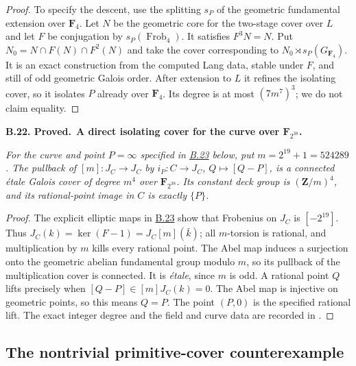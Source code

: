 \documentclass[11pt,a4paper]{article}
\newenvironment{claim}[3]{\par\medskip\noindent\hypertarget{#1}{\textbf{#1. #2.}}\ \textbf{#3.}\par\nopagebreak\smallskip\begingroup\itshape}{\endgroup\par\smallskip}
\newcommand{\statementref}[1]{\hyperlink{#1}{#1}}
\begin{document}
\begin{proof}
To specify the descent, use the splitting $s_P$ of the geometric
fundamental extension over $\mathbf F_4$. Let $N$ be the geometric
core for the two-stage cover over $L$ and let $F$ be conjugation
by $s_P(\operatorname{Frob}_4)$. It satisfies $F^3N=N$. Put
$N_0=N\cap F(N)\cap F^2(N)$ and take the cover corresponding to
$N_0\rtimes s_P(G_{\mathbf F_4})$. It is an exact construction
from the computed Lang data, stable under $F$, and still of odd
geometric Galois order. After extension to $L$ it refines the
isolating cover, so it isolates $P$ already over $\mathbf F_4$.
Its degree is at most $(7m^7)^3$; we do not claim equality.
\end{proof}

\begin{claim}{B.22}{Proved}{A direct isolating cover for the curve over $\mathbf F_{2^{38}}$}
For the curve and point $P=\infty$ specified in
\statementref{B.23} below, put $m=2^{19}+1=524289$.
The pullback of $[m]:J_C\to J_C$ by
$i_P:C\to J_C$, $Q\mapsto[Q-P]$, is a connected
\emph{\'etale} Galois cover of degree $m^4$ over
$\mathbf F_{2^{38}}$. Its constant deck group is
$(\mathbf Z/m)^4$, and its rational-point image in $C$ is
exactly $\{P\}$.
\end{claim}
\begin{proof}
The explicit elliptic maps in \statementref{B.23} show that
Frobenius on $J_C$ is $[-2^{19}]$. Thus
$J_C(k)=\ker(F-1)=J_C[m](\bar k)$; all $m$-torsion is rational,
and multiplication by $m$ kills every rational point.
The Abel map induces a surjection onto the geometric abelian
fundamental group modulo $m$, so its pullback of the multiplication
cover is connected. It is \emph{\'etale}, since $m$ is odd.
A rational point $Q$ lifts precisely when $[Q-P]\in[m]J_C(k)=0$.
The Abel map is injective on geometric points, so this means $Q=P$.
The point $(P,0)$ is the specified rational lift. The exact integer
degree and the field and curve data are recorded in
.
\end{proof}



\subsection{The nontrivial primitive-cover counterexample}
\end{document}
